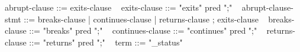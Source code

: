 \begin{syntax}
    { abrupt-clause } ::= { exits-clause }
    \
    { exits-clause } ::= { "exits" pred ";" }
    \
    { abrupt-clause-stmt } ::= { breaks-clause } | { continues-clause } |
    { returns-clause } ;
    { exits-clause }
    \
    { breaks-clause } ::= { "breaks" pred ";" }
    \
    { continues-clause } ::= { "continues" pred ";" }
    \
    { returns-clause } ::= { "returns" pred ";" }
    \
    { term } ::= { "\exit_status" }
  \end{syntax}
